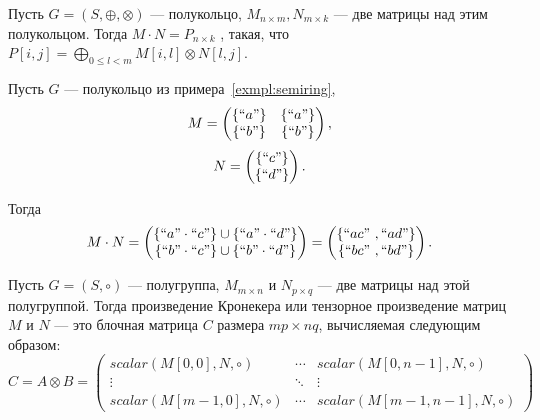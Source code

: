 \begin{definition}\label{def:MxM}

Пусть $G = (S,\oplus, \otimes)$ --- полукольцо, $M_{n \times m}, N_{m\times k}$ --- две матрицы над этим полукольцом.
Тогда
$
M\cdot N = P_{n \times k}
$
, такая, что $P[i,j] = \bigoplus_{0 \leq l < m} M[i,l] \otimes N[l,j]$.

\end{definition}

\begin{example}
Пусть $G$ --- полукольцо из примера~\ref{exmpl:semiring},
$$ M =
\begin{pmatrix}
\{``a"\} & \{``a"\}\\
\{``b"\} & \{``b"\}\\
\end{pmatrix},
$$
$$ N =
\begin{pmatrix}
\{``c"\} \\
\{``d"\} \\
\end{pmatrix}.
$$

Тогда
$$
M \cdot N =
\begin{pmatrix}
\{``a" \cdot ``c"\} \cup \{``a" \cdot ``d"\} \\
\{``b" \cdot ``c"\} \cup \{``b" \cdot ``d"\}
\end{pmatrix}=
\begin{pmatrix}
\{``ac" \ ,  ``ad"\} \\
\{``bc" \ , ``bd"\}
\end{pmatrix}.
$$

\end{example}


\begin{definition}
Пусть $G = (S,\circ)$ --- полугруппа, $M_{m\times n}$ и $N_{p\times q}$ --- две матрицы над этой полугруппой.
Тогда произведение Кронекера или тензорное произведение матриц $M$ и $N$ --- это блочная матрица $C$ размера $mp \times nq$, вычисляемая следующим образом:
$$
C = A \otimes B =
\begin{pmatrix}
scalar(M[0,0],N,\circ)   & \cdots & scalar(M[0,n-1],N,\circ)   \\
\vdots                   & \ddots & \vdots       \\
scalar(M[m-1,0],N,\circ) & \cdots & scalar(M[m-1,n-1],N,\circ)
\end{pmatrix}
$$

\end{definition}

